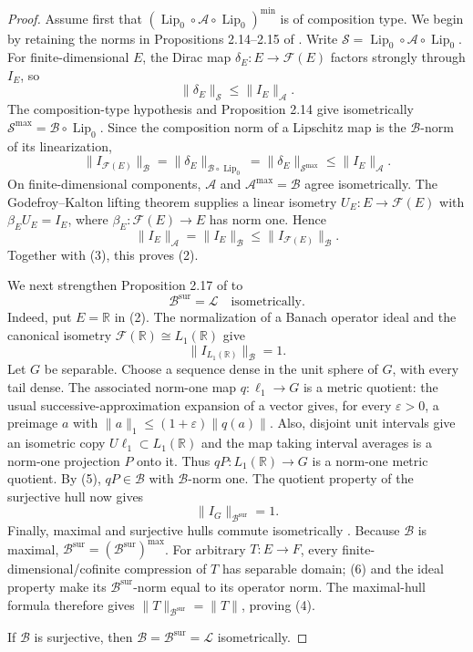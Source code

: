 \documentclass[11pt]{article}
\newcommand{\Lip}{\operatorname{Lip}_0}
\newcommand{\Lop}{\mathcal L}
\newcommand{\A}{\mathcal A}
\newcommand{\B}{\mathcal B}
\begin{document}
\begin{proof}
Assume first that $(\Lip\circ\A\circ\Lip)^{\min}$ is of composition type.
We begin by retaining the norms in Propositions 2.14--2.15 of \cite{AT}.
Write $\mathcal S=\Lip\circ\A\circ\Lip$. For finite-dimensional $E$, the
Dirac map $\delta_E:E\to\mathcal F(E)$ factors strongly through $I_E$, so
\[
 \|\delta_E\|_{\mathcal S}\leq \|I_E\|_{\A}.
\]
The composition-type hypothesis and Proposition 2.14 give isometrically
$\mathcal S^{\max}=\B\circ\Lip$. Since the composition norm of a Lipschitz
map is the $\B$-norm of its linearization,
\[
 \|I_{\mathcal F(E)}\|_{\B}
 =\|\delta_E\|_{\B\circ\Lip}
 =\|\delta_E\|_{\mathcal S^{\max}}
 \leq \|I_E\|_{\A}. \tag{3}
\]
On finite-dimensional components, $\A$ and $\A^{\max}=\B$ agree
isometrically. The Godefroy--Kalton lifting theorem \cite{GK} supplies a
linear isometry $U_E:E\to\mathcal F(E)$ with
$\beta_EU_E=I_E$, where $\beta_E:\mathcal F(E)\to E$ has norm one. Hence
\[
 \|I_E\|_{\A}=\|I_E\|_{\B}
 \leq \|I_{\mathcal F(E)}\|_{\B}.
\]
Together with (3), this proves (2).

We next strengthen Proposition 2.17 of \cite{AT} to
\[
   \B^{\mathrm{sur}}=\Lop \quad\text{isometrically}. \tag{4}
\]
Indeed, put $E=\mathbb R$ in (2). The normalization of a Banach operator
ideal and the canonical isometry
$\mathcal F(\mathbb R)\cong L_1(\mathbb R)$ give
\[
 \|I_{L_1(\mathbb R)}\|_{\B}=1. \tag{5}
\]
Let $G$ be separable. Choose a sequence dense in the unit sphere of $G$, with
every tail dense. The associated norm-one map $q:\ell_1\to G$ is a metric
quotient: the usual successive-approximation expansion of a vector gives,
for every $\varepsilon>0$, a preimage $a$ with
$\|a\|_1\leq(1+\varepsilon)\|q(a)\|$. Also, disjoint unit intervals give an
isometric copy $U\ell_1\subset L_1(\mathbb R)$ and the map taking interval
averages is a norm-one projection $P$ onto it. Thus $qP:L_1(\mathbb R)\to G$
is a norm-one metric quotient. By (5), $qP\in\B$ with $\B$-norm one. The
quotient property of the surjective hull now gives
\[
 \|I_G\|_{\B^{\mathrm{sur}}}=1. \tag{6}
\]
Finally, maximal and surjective hulls commute isometrically
\cite{DF,Pietsch}. Because $\B$ is maximal,
$\B^{\mathrm{sur}}=(\B^{\mathrm{sur}})^{\max}$. For arbitrary $T:E\to F$,
every finite-dimensional/cofinite compression of $T$ has separable domain;
(6) and the ideal property make its $\B^{\mathrm{sur}}$-norm equal to its
operator norm. The maximal-hull formula therefore gives
$\|T\|_{\B^{\mathrm{sur}}}=\|T\|$, proving (4).

If $\B$ is surjective, then $\B=\B^{\mathrm{sur}}=\Lop$ isometrically.


\end{proof}
\end{document}
